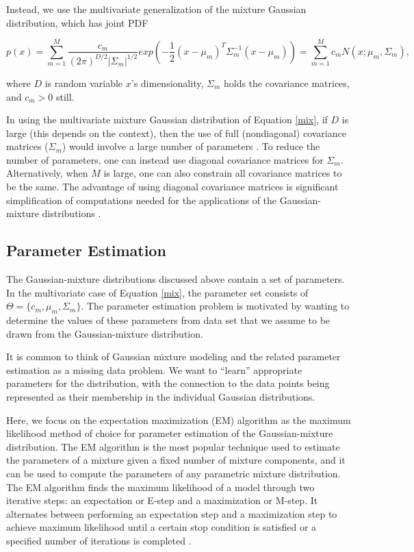 \documentclass[12pt]{article}
\begin{document}
Instead, we use the multivariate generalization of the mixture Gaussian
distribution, which has joint PDF

\begin{equation}
\label{joint}
p(x) = \sum_{m=1}^M \frac{c_m}{(2\pi)^{D/2} |\Sigma_m|^{1/2}} exp(-\frac{1}{2}(x-\mu_m)^T \Sigma_m^{-1}(x-\mu_m)) = \sum_{m=1}^M c_m N(x; \mu_m, \Sigma_m),
\end{equation}

where \(D\) is random variable \(x\)'s dimensionality, \(\Sigma_m\)
holds the covariance matrices, and \(c_m > 0\) still.

In using the multivariate mixture Gaussian distribution of Equation
\ref{mix}, if \(D\) is large (this depends on the context), then the use
of full (nondiagonal) covariance matrices (\(\Sigma_m\)) would involve a
large number of parameters \citep{bouguila2020mixture}. To reduce the
number of parameters, one can instead use diagonal covariance matrices
for \(\Sigma_m\). Alternatively, when \(M\) is large, one can also
constrain all covariance matrices to be the same. The advantage of using
diagonal covariance matrices is significant simplification of
computations needed for the applications of the Gaussian-mixture
distributions \citep{wan2019novel}.

\hypertarget{parameter-estimation}{%
\subsection{Parameter Estimation}\label{parameter-estimation}}

The Gaussian-mixture distributions discussed above contain a set of
parameters. In the multivariate case of Equation \ref{mix}, the
parameter set consists of \(\Theta = \{c_m, \mu_m, \Sigma_m\}\). The
parameter estimation problem is motivated by wanting to determine the
values of these parameters from data set that we assume to be drawn from
the Gaussian-mixture distribution.

It is common to think of Gaussian mixture modeling and the related
parameter estimation as a missing data problem. We want to ``learn''
appropriate parameters for the distribution, with the connection to the
data points being represented as their membership in the individual
Gaussian distributions.

Here, we focus on the expectation maximization (EM) algorithm as the
maximum likelihood method of choice for parameter estimation of the
Gaussian-mixture distribution. The EM algorithm is the most popular
technique used to estimate the parameters of a mixture given a fixed
number of mixture components, and it can be used to compute the
parameters of any parametric mixture distribution. The EM algorithm
finds the maximum likelihood of a model through two iterative steps: an
expectation or E-step and a maximization or M-step. It alternates
between performing an expectation step and a maximization step to
achieve maximum likelihood until a certain stop condition is satisfied
or a specified number of iterations is completed \citep{wan2019novel}.
\end{document}
